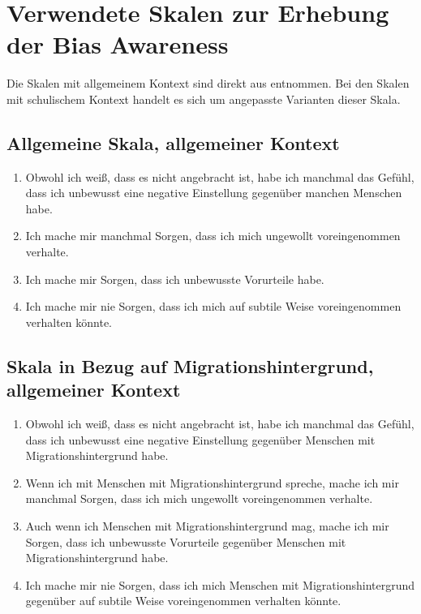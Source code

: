 \chapter{Verwendete Skalen zur Erhebung der Bias Awareness}
\label{app:skalen}

Die Skalen mit allgemeinem Kontext sind direkt aus \citep{bonefeld2022reflexion} entnommen.
Bei den Skalen mit schulischem Kontext handelt es sich um angepasste Varianten dieser Skala.


\section*{Allgemeine Skala, allgemeiner Kontext}
\label{app:skala-allg-allg}

\begin{enumerate}
	\item Obwohl ich weiß, dass es nicht angebracht ist, habe ich manchmal das Gefühl, dass ich unbewusst eine negative Einstellung gegenüber manchen Menschen habe.

	\item Ich mache mir manchmal Sorgen, dass ich mich ungewollt voreingenommen verhalte.

	\item Ich mache mir Sorgen, dass ich unbewusste Vorurteile habe.

	\item Ich mache mir nie Sorgen, dass ich mich auf subtile Weise voreingenommen verhalten könnte.
\end{enumerate}


\section*{Skala in Bezug auf Migrationshintergrund, allgemeiner Kontext}
\label{app:skala-migr-allg}

\begin{enumerate}
	\item Obwohl ich weiß, dass es nicht angebracht ist, habe ich manchmal das Gefühl, dass ich unbewusst eine negative Einstellung gegenüber Menschen mit Migrationshintergrund habe.

	\item Wenn ich mit Menschen mit Migrationshintergrund spreche, mache ich mir manchmal Sorgen, dass ich mich ungewollt voreingenommen verhalte.

	\item Auch wenn ich Menschen mit Migrationshintergrund mag, mache ich mir Sorgen, dass ich unbewusste Vorurteile gegenüber Menschen mit Migrationshintergrund habe.

	\item Ich mache mir nie Sorgen, dass ich mich Menschen mit Migrationshintergrund gegenüber auf subtile Weise voreingenommen verhalten könnte.
\end{enumerate}


